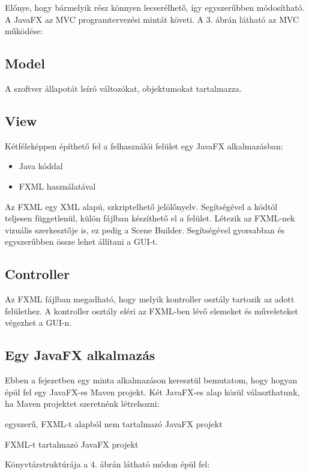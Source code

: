 Előnye, hogy bármelyik rész könnyen lecserélhető, így egyszerűbben módosítható. A JavaFX az MVC programtervezési mintát követi. A 3. ábrán látható az MVC működése: 


\subsection*{Model} 

A szoftver állapotát leíró változókat, objektumokat tartalmazza. 

\subsection*{View}

Kétféleképpen építhető fel a felhasználói felület egy JavaFX alkalmazásban: 

\begin{itemize}
\item Java kóddal 
\item FXML használatával 
\end{itemize}

Az FXML egy XML alapú, szkriptelhető jelölőnyelv. Segítségével a kódtól teljesen függetlenül, külön fájlban készíthető el a felület. Létezik az FXML-nek vizuális szerkesztője is, ez pedig a Scene Builder. Segítségével gyorsabban és egyszerűbben össze lehet állítani a GUI-t. 

\subsection*{Controller}

Az FXML fájlban megadható, hogy melyik kontroller osztály tartozik az adott felülethez. A kontroller osztály eléri az FXML-ben lévő elemeket és műveleteket végezhet a GUI-n.


\subsection{Egy JavaFX alkalmazás}

Ebben a fejezetben egy minta alkalmazáson keresztül bemutatom, hogy hogyan épül fel egy JavaFX-es Maven projekt. Két JavaFX-es alap közül választhatunk, ha Maven projektet szeretnénk létrehozni: 

egyszerű, FXML-t alapból nem tartalmazó JavaFX projekt 

FXML-t tartalmazó JavaFX projekt 

Könyvtárstruktúrája a 4. ábrán látható módon épül fel: 

